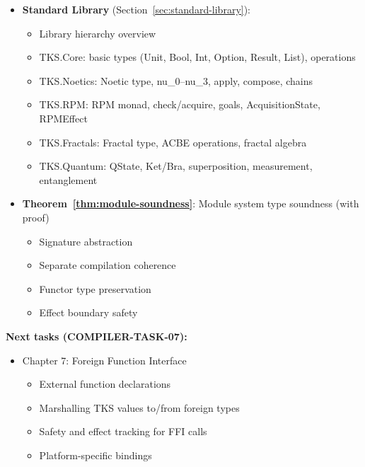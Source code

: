 \begin{tcolorbox}[colback=green!5!white,colframe=green!50!black,title=\textbf{Handoff: COMPILER-TASK-06 Complete},breakable]
\begin{itemize}
\begin{itemize}
      \item File types: .tks (implementation), .tksi (interface), .tkso (object)
      \item File-to-module path mapping
      \item Interface file content and stability
      \item Implementation file structure
      \item Compilation pipeline (parse, resolve, typecheck, generate, compile)
      \item Dependency graph and linking process
      \item Incremental compilation
    \end{itemize}
  \item \textbf{Standard Library} (Section~\ref{sec:standard-library}):
    \begin{itemize}
      \item Library hierarchy overview
      \item TKS.Core: basic types (Unit, Bool, Int, Option, Result, List), operations
      \item TKS.Noetics: Noetic type, nu\_0--nu\_3, apply, compose, chains
      \item TKS.RPM: RPM monad, check/acquire, goals, AcquisitionState, RPMEffect
      \item TKS.Fractals: Fractal type, ACBE operations, fractal algebra
      \item TKS.Quantum: QState, Ket/Bra, superposition, measurement, entanglement
    \end{itemize}
  \item \textbf{Theorem~\ref{thm:module-soundness}}: Module system type soundness (with proof)
    \begin{itemize}
      \item Signature abstraction
      \item Separate compilation coherence
      \item Functor type preservation
      \item Effect boundary safety
    \end{itemize}
\end{itemize}

\textbf{Next tasks (COMPILER-TASK-07):}
\begin{itemize}
  \item Chapter 7: Foreign Function Interface
    \begin{itemize}
      \item External function declarations
      \item Marshalling TKS values to/from foreign types
      \item Safety and effect tracking for FFI calls
      \item Platform-specific bindings
    \end{itemize}
\end{itemize}
\end{tcolorbox}

